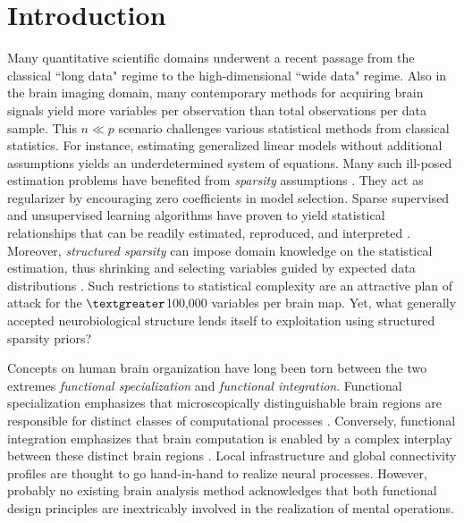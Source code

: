 \documentclass{article}
\begin{document}
\section{Introduction}
Many quantitative scientific domains underwent a
recent passage from the classical ``long data" regime to
the high-dimensional ``wide data" regime.
Also in the brain imaging domain,
many contemporary methods for acquiring brain signals yield
more variables per observation than
total observations per data sample.
This $n \ll p$ scenario challenges various statistical methods from
classical statistics.
For instance,
estimating generalized linear models without additional assumptions
yields an underdetermined system of equations.
%
Many such ill-posed estimation problems
have benefited from
\textit{sparsity} assumptions
\cite{hastie2015statistical}.
They act as regularizer by encouraging zero coefficients
in model selection.
Sparse supervised and unsupervised
learning algorithms have proven to yield
statistical relationships that can be readily
estimated, reproduced, and interpreted
\cite{giraud2014introduction}.
%
Moreover, \textit{structured sparsity} can impose
domain knowledge on the 
statistical estimation,
thus shrinking and selecting variables guided by
expected data distributions
\cite{bach2012optimization}.
Such restrictions to statistical complexity
are an attractive plan of attack
for the $\textgreater$100,000 variables per brain map.
Yet, what generally accepted neurobiological structure lends itself
to exploitation using structured sparsity priors?



Concepts on human brain organization have long been torn
between the two extremes
\textit{functional specialization} and \textit{functional integration}.
Functional specialization emphasizes that microscopically distinguishable
brain regions are responsible for distinct classes of computational 
processes
\cite{kanwisher2010functional}.
Conversely, functional integration emphasizes that brain computation
is enabled by a complex interplay between these
distinct brain regions \cite{sporns14nn}.
%
Local
infrastructure
and global connectivity profiles are thought to go hand-in-hand
to realize neural processes.
%
However,
probably no existing brain analysis method acknowledges that
both functional design principles are inextricably involved
in the realization of mental operations.
\end{document}
